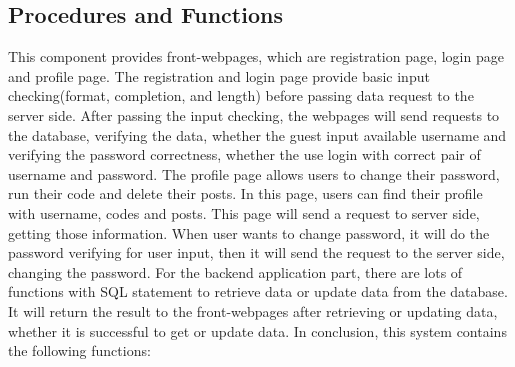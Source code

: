 \subsection{Procedures and Functions}
This component provides front-webpages, which are registration page, login page and profile page.\newline\newline
The registration and login page provide basic input checking(format, completion, and length) before passing data request to the server side. After passing the input checking, the webpages will send requests to the database, verifying the data, whether the guest input available username and verifying the password correctness, whether the use login with correct pair of username and password.\newline\newline
The profile page allows users to change their password, run their code and delete their posts. In this page, users can find their profile with username, codes and posts. This page will send a request to server side, getting those information. When user wants to change password, it will do the password verifying for user input, then it will send the request to the server side, changing the password.\newline\newline
For the backend application part, there are lots of functions with SQL statement to retrieve data or update data from the database. It will return the result to the front-webpages after retrieving or updating data, whether it is successful to get or update data.\newline\newline
In conclusion, this system contains the following functions:\newline

